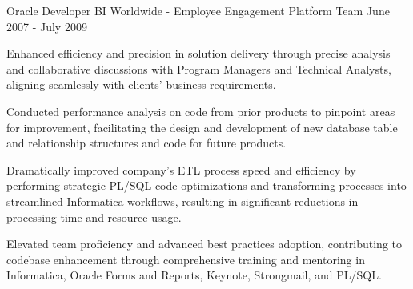 \begin{cventries}
  \cventry
    {Oracle Developer} %
    {BI Worldwide - Employee Engagement Platform Team} %
    {} %
    {June 2007 - July 2009} %
    {
      \begin{cvitems} %
        \item {Enhanced efficiency and precision in solution delivery through precise analysis and collaborative discussions with Program Managers and Technical Analysts, aligning seamlessly with clients' business requirements.}
        \item {Conducted performance analysis on code from prior products to pinpoint areas for improvement, facilitating the design and development of new database table and relationship structures and code for future products.}
        \item {Dramatically improved company's ETL process speed and efficiency by performing strategic PL/SQL code optimizations and transforming processes into streamlined Informatica workflows, resulting in significant reductions in processing time and resource usage.}
        \item {Elevated team proficiency and advanced best practices adoption, contributing to codebase enhancement through comprehensive training and mentoring in Informatica, Oracle Forms and Reports, Keynote, Strongmail, and PL/SQL.}
      \end{cvitems}
    }
    
\end{cventries}
